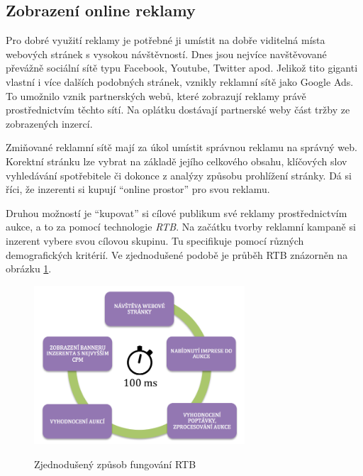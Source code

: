     \subsection{Zobrazení online reklamy}
    Pro dobré využití reklamy je potřebné ji umístit na dobře viditelná místa webových stránek s vysokou návštěvností.
    Dnes jsou nejvíce navštěvované převážně sociální sítě typu Facebook, Youtube, Twitter apod. Jelikož tito giganti vlastní i více dalších podobných stránek,
    vznikly reklamní sítě jako Google Ads. To umožnilo vznik partnerských webů, které zobrazují reklamy právě prostřednictvím těchto sítí.
    Na oplátku dostávají partnerské weby část tržby ze zobrazených inzercí.

    Zmiňované reklamní sítě mají za úkol umístit správnou reklamu na správný web.
    Korektní stránku lze vybrat na základě jejího celkového obsahu, klíčových slov vyhledávání spotřebitele či dokonce z analýzy způsobu prohlížení stránky.
    Dá si říci, že inzerenti si kupují \enquote{online prostor} pro svou reklamu. 

    Druhou možností je \enquote{kupovat} si cílové publikum své reklamy prostřednictvím aukce, a to za pomocí technologie \emph{RTB}.
    Na začátku tvorby reklamní kampaně si inzerent vybere svou cílovou skupinu. Tu specifikuje pomocí různých demografických kritérií.
    Ve zjednodušené podobě je průběh RTB znázorněn na obrázku \ref{fig:rtb}.

    \begin{figure}[h]
        \centering
        \caption[Fungování RTB]{Zjednodušený způsob fungování RTB \cite{rtb}}
        \includegraphics[width=0.7\textwidth]{Figures/rtb.png}
        \label{fig:rtb}
    \end{figure}

\endinput
